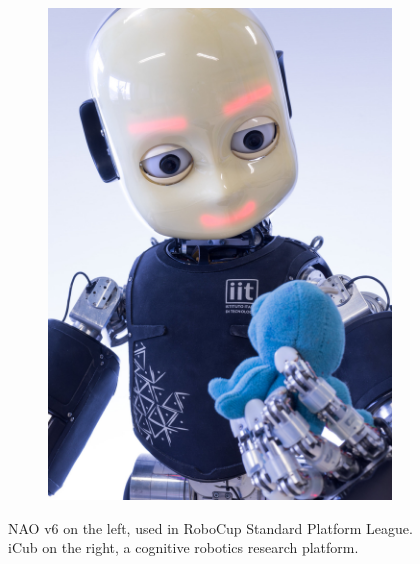 \begin{figure}
\begin{subfigure}[b]{0.4\textwidth}
    \includegraphics[width=\textwidth]{figures/iCub.jpeg}
    \caption{}
    \label{fig:iCub}
  \end{subfigure}
  \caption{NAO v6 \cite{NAOdesign} on the left, used in RoboCup Standard 
      Platform League. iCub \cite{Sandini2007iCub} on the right, a cognitive 
      robotics research platform.}
\end{figure}

